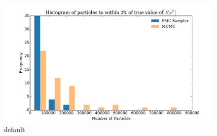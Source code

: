 \documentclass[12pt]{elsarticle}
\begin{document}
\begin{figure}[htbp]
\begin{center}
\includegraphics[width = \textwidth]{plots/iterationsEx2.pdf}
\caption{default}
\label{default}
\end{center}
\end{figure}





\end{document}

